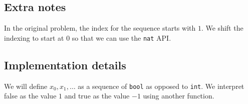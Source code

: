 \documentclass{article}
\begin{document}
\subsection*{Extra notes}

In the original problem, the index for the sequence starts with $1$.
We shift the indexing to start at $0$ so that we can use the \texttt{nat} API.



\subsection*{Implementation details}

We will define $x_0, x_1, \ldots$ as a sequence of \texttt{bool} as opposed to \texttt{int}.
We interpret false as the value $1$ and true as the value $-1$ using another function.
\end{document}
